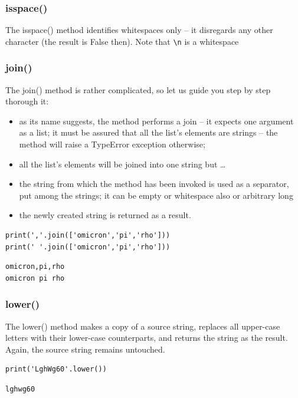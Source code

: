 \documentclass[11pt]{article}
\begin{document}
\subsubsection{isspace()}
\label{sec:orgf582f54}
The isspace() method identifies whitespaces only – it disregards any
other character (the result is False then). Note that \texttt{\textbackslash{}n} is a whitespace
\subsubsection{join()}
\label{sec:org37a322e}
The join() method is rather complicated, so let us guide you step by
step thorough it:
\begin{itemize}
\item as its name suggests, the method performs a join – it expects one
argument as a list; it must be assured that all the list’s elements
are strings – the method will raise a TypeError exception otherwise;
\item all the list’s elements will be joined into one string but \ldots{}
\item the string from which the method has been invoked is used as a
separator, put among the strings; it can be empty or whitespace also
or arbitrary long
\item the newly created string is returned as a result.
\end{itemize}

\begin{verbatim}
print(','.join(['omicron','pi','rho']))
print(' '.join(['omicron','pi','rho']))
\end{verbatim}

\begin{verbatim}
omicron,pi,rho
omicron pi rho
\end{verbatim}

\subsubsection{lower()}
\label{sec:org0bc0135}
The lower() method makes a copy of a source string, replaces all
upper-case letters with their lower-case counterparts, and returns the
string as the result. Again, the source string remains untouched.

\begin{verbatim}
print('LghWg60'.lower())
\end{verbatim}

\begin{verbatim}
lghwg60
\end{verbatim}
\end{document}
